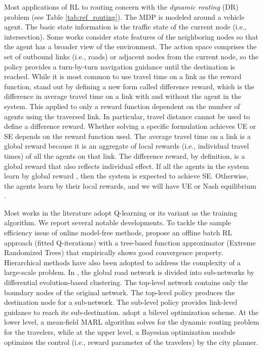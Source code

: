 \documentclass{article}
\begin{document}
Most applications of RL to routing concern with the \emph{dynamic routing} (DR) problem (see Table \ref{tab:ref_routing}).  The MDP is modeled around a vehicle agent. The basic state information is the traffic state of the current node (i.e., intersection). Some works consider state features of the neighboring nodes \citep{kim2005optimal,mao2018reinforcement} so that the agent has a broader view of the environment. The action space comprises the set of outbound links (i.e., roads) or adjacent nodes from the current node, so the policy provides a turn-by-turn navigation guidance until the destination is reached. While it is most common to use travel time on a link as the reward function, \cite{tumer2008aligning,grunitzki2014individual} stand out by defining a new form called difference reward, which is the difference in average travel time on a link with and without the agent in the system. This applied to only a reward function dependent on the number of agents using the traversed link. In particular, travel distance cannot be used to define a difference reward. Whether solving a specific formulation achieves UE or SE depends on the reward function used. The average travel time on a link is a global reward because it is an aggregate of local rewards (i.e., individual travel times) of all the agents on that link. The difference reward, by definition, is a global reward that also reflects individual effect. If all the agents in the system learn by global reward \citep{tumer2008aligning,grunitzki2014individual,shou2020multi}, then the system is expected to achieve SE. Otherwise, the agents learn by their local rewards, and we will have UE or Nash equilibrium \citep{kim2005optimal,yu2012q,mao2018reinforcement,bazzan2016multiagent,wen2019hierarchical}.

Most works in the literature adopt Q-learning or its variant as the training algorithm. We report several notable developments. To tackle the sample efficiency issue of online model-free methods, \cite{mao2018reinforcement} propose an offline batch RL approach (fitted Q-iterations) with a tree-based function approximator (Extreme Randomized Trees) that empirically shows good convergence property. Hierarchical methods have also been adopted to address the complexity of a large-scale problem. In \citep{wen2019hierarchical}, the global road network is divided into sub-networks by differential evolution-based clustering.
The top-level network contains only the boundary nodes of the original network. The top-level policy produces the destination node for a sub-network. The sub-level policy provides link-level guidance to reach its sub-destination. \cite{shou2020reward} adopt a bilevel optimization scheme. At the lower level, a mean-field MARL algorithm solves for the dynamic routing problem for the travelers, while at the upper level, a Bayesian optimization module optimizes the control (i.e., reward parameter of the travelers) by the city planner.
\end{document}
